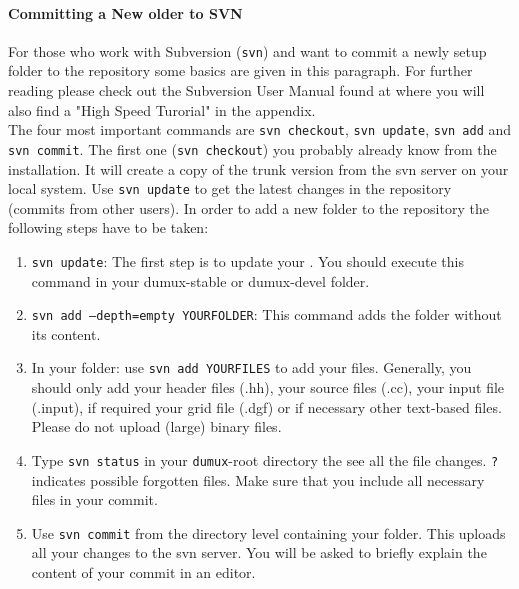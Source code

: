 \paragraph{Committing a New older to SVN}
For those who work with Subversion (\texttt{svn}) and want to commit a newly setup folder to the repository some basics are
given in this paragraph. For further reading please check out the Subversion User Manual found at \cite{APACHE-SUBVERSION-HP}
where you will also find a "High Speed Turorial" in the appendix. \\
The four most important commands are \texttt{svn checkout}, \texttt{svn update},  \texttt{svn add}
and \texttt{svn commit}. The first one (\texttt{svn checkout}) you probably already know from the \Dumux installation.
It will create a copy of the trunk version from the svn server on your local system. Use \texttt{svn update} to get the
latest changes in the repository (commits from other users). In order to add a new folder to the repository the following
steps have to be taken:

\begin{enumerate}[1)]
\item \texttt{svn update}: The first step is to update your \Dumux. You should execute this command in your
      dumux-stable or dumux-devel folder.
\item \texttt{svn add --depth=empty YOURFOLDER}: This command adds the folder without its content.
\item In your folder: use \texttt{svn add YOURFILES} to add your files. Generally, you should only add
      your header files (.hh), your source files (.cc), your input file (.input), if required your
      grid file (.dgf) or if necessary other text-based files. Please do not upload (large) binary files.
\item Type \texttt{svn status} in your \texttt{dumux}-root directory the see all the file changes.
      \texttt{?} indicates possible forgotten files. Make sure that you include all necessary
      files in your commit.
\item Use \texttt{svn commit} from the directory level containing your folder. This uploads all your changes to the
      svn server. You will be asked to briefly explain the content of your commit in an editor.
\end{enumerate}
